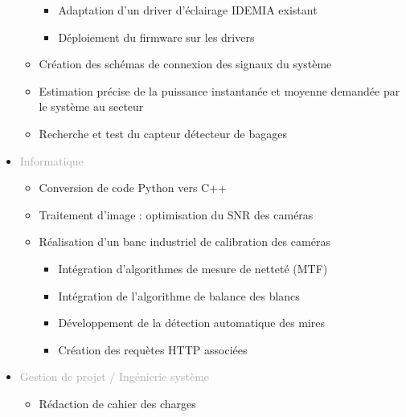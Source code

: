\documentclass{article}
\begin{document}
\begin{tabular}
\begin{itemize}
\begin{itemize}
\begin{itemize}
                \item \textcolor{gray!80}{Adaptation d'un driver d'éclairage IDEMIA existant}
                \item \textcolor{gray!80}{Déploiement du firmware sur les drivers}
            \end{itemize}
            \item \textcolor{gray!80}{Création des schémas de connexion des signaux du système}
            \item \textcolor{gray!80}{Estimation précise de la puissance instantanée et moyenne demandée par le système au secteur}
            \item \textcolor{gray!80}{Recherche et test du capteur détecteur de bagages}
        \end{itemize}
        \item \textcolor{darkGray}{Informatique} 
        \begin{itemize}
        [label={\textcolor{gray!80}{\checkmark}}, topsep=0pt, partopsep=0pt, itemsep=0.5pt, parsep=2pt] 
            \item \textcolor{gray!80}{Conversion de code Python vers C++}
            \item \textcolor{gray!80}{Traitement d'image : optimisation du SNR des caméras}
            \item \textcolor{gray!80}{Réalisation d'un banc industriel de calibration des caméras}
            \begin{itemize}
            [label={\textcolor{gray!80}{\checkmark}}, topsep=0pt, partopsep=0pt, itemsep=0.5pt, parsep=2pt]   
                \item \textcolor{gray!80}{Intégration d'algorithmes de mesure de netteté (MTF) }
                \item \textcolor{gray!80}{Intégration de l'algorithme de balance des blancs}
                \item \textcolor{gray!80}{Développement de la détection automatique des mires}
                \item \textcolor{gray!80}{Création des requètes HTTP associées}
            \end{itemize}
        \end{itemize}
        \item \textcolor{darkGray}{Gestion de projet / Ingénierie système}
        \begin{itemize}
        [label={\textcolor{gray!80}{\checkmark}}, topsep=0pt, partopsep=0pt, itemsep=0.5pt, parsep=2pt] 
            \item \textcolor{gray!80}{Rédaction de cahier des charges}

\end{itemize}
\end{itemize}
\end{tabular}
\end{document}
